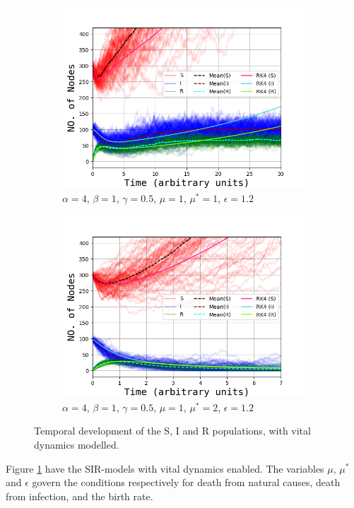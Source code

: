 \begin{figure}[H]
\begin{subfigure}{0.49\linewidth}
			\includegraphics[width=1.1\linewidth]{Figures/OppgB_1_1_12.png}
			\caption{$\alpha = 4$, $\beta = 1$, $\gamma=0.5$, $\mu=1$, $\mu^*=1$, $\epsilon=1.2$}
		\end{subfigure}
		\begin{subfigure}{0.49\linewidth}
		    \includegraphics[width=1.1\linewidth]{Figures/OppgB_1_2_12.png}
			\caption{$\alpha = 4$, $\beta = 1$, $\gamma=0.5$, $\mu=1$, $\mu^*=2$, $\epsilon=1.2$}
		\end{subfigure}
		\caption{Temporal development of the S, I and R populations, with vital dynamics modelled.}
		\label{fig:vitaldynamics}
	\end{figure}
	
Figure \ref{fig:vitaldynamics} have the SIR-models with vital dynamics enabled. The variables $\mu$, $\mu^*$ and $\epsilon$ govern the conditions respectively for death from natural causes, death from infection, and the birth rate.


